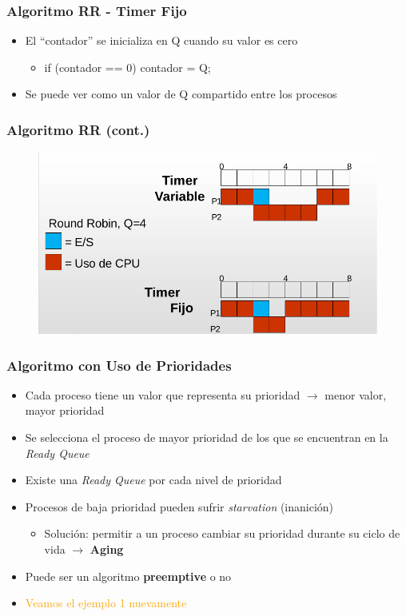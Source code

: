 \begin{frame}
  \frametitle{Algoritmo \textbf{RR - Timer Fijo}}
  \begin{itemize}
  		\item El ``contador'' se inicializa en Q cuando su valor es cero
  		\begin{itemize}
  			\item if (contador == 0) contador = Q;
  		\end{itemize}
		\item Se puede ver como un valor de Q compartido entre los procesos
  \end{itemize}
\end{frame}

\begin{frame}
  \frametitle{Algoritmo \textbf{RR} (cont.)}
	\begin{figure}
	    \includegraphics[scale=0.4]{images/ejemploRR.png}
	\end{figure}
\end{frame}

\begin{frame}
  \frametitle{Algoritmo con \textbf{Uso de Prioridades}}
  \begin{itemize}
  		\item Cada proceso tiene un valor que representa su prioridad $\rightarrow$ menor valor, mayor prioridad
		\item Se selecciona el proceso de mayor prioridad de los que se encuentran en la \emph{Ready Queue}
		\item Existe una \emph{Ready Queue} por cada nivel de prioridad
		\item Procesos de baja prioridad pueden sufrir \emph{starvation} (inanición)
		\begin{itemize}
			\item Solución: permitir a un proceso cambiar su prioridad durante su ciclo de vida $\rightarrow$ \textbf{Aging}
		\end{itemize}
		\item Puede ser un algoritmo \textbf{preemptive} o no
		\pause
		\item \textcolor{orange}{Veamos el ejemplo 1 nuevamente}
  \end{itemize}
\end{frame}

